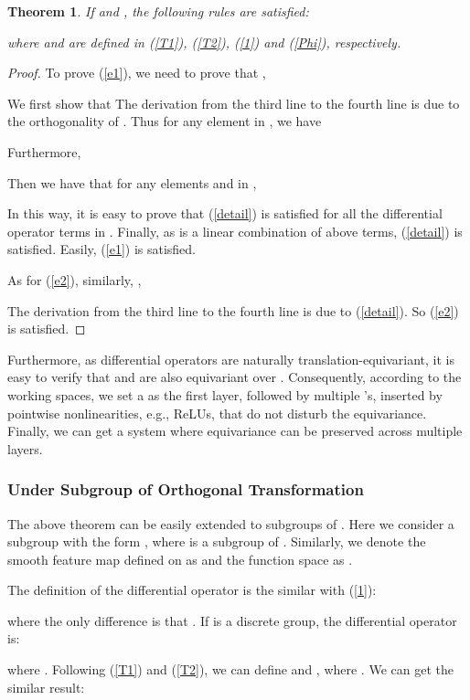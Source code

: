 \documentclass{article}
\newtheorem{theorem}{Theorem}
\newtheorem{proof}{Proof}
\begin{document}
\begin{theorem}
	If  and , the following rules are satisfied:
	
	where  and  are defined in (\ref{T1}), (\ref{T2}), (\ref{1}) and (\ref{Phi}), respectively.
	\label{theorem1}
\end{theorem}

\begin{proof}
	To prove (\ref{e1}), we need to prove that ,
	
	We first show that
	\small{
		}
	The derivation from the third line to the fourth line is due to the orthogonality of . Thus for any element  in , we have
	
	Furthermore,
	
	Then we have that for any elements  and  in ,
	
	In this way, it is easy to prove that (\ref{detail}) is satisfied for all the differential operator terms in . Finally, as  is a linear combination of above terms, (\ref{detail}) is satisfied. Easily, (\ref{e1}) is satisfied.
	
	As for (\ref{e2}), similarly, ,
	
	The derivation from the third line to the fourth line is due to (\ref{detail}). So (\ref{e2}) is satisfied.  
\end{proof}

Furthermore, as differential operators are naturally translation-equivariant, it is easy to verify that  and  are also equivariant over . Consequently, according to the working spaces, we set a  as the first layer,
followed by multiple 's, inserted by pointwise nonlinearities, e.g., ReLUs, that do not disturb the equivariance. Finally, we can get a system where equivariance can be preserved across multiple layers.

\subsubsection{Under Subgroup of Orthogonal Transformation \label{subgroup}}
The above theorem can be easily extended to subgroups of . Here we consider a subgroup  with the form , where  is a subgroup of . 
Similarly, we denote the smooth feature map defined on  as  and the function space as .

The definition of the differential operator  is the similar with (\ref{1}):

where the only difference is that . If  is a discrete group, the differential operator  is:

where . Following (\ref{T1}) and (\ref{T2}), we can define  and , where . We can get the similar result:
\end{document}
